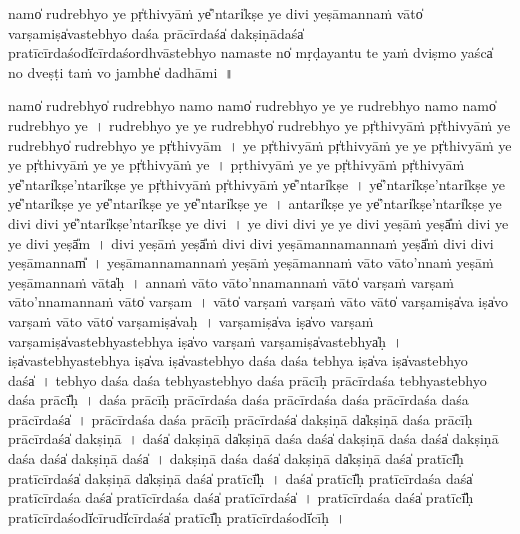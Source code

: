 \documentclass[parskip, DIV=14]{scrartcl}
\begin{document}
{namo̍ ru॒drebhyo॒ ye pṛ̍thi॒vyāṁ ye̎'ntari̍kṣe॒ ye di॒vi yeṣā॒manna॒ṁ vāto̍ va॒rṣamiṣa̍va॒stebhyo॒ daśa॒ prācī॒rdaśa̍ dakṣi॒ṇādaśa̍ pra॒tīcī॒rdaśodī̍cī॒rdaśo॒rdhvāstebhyo॒ nama॒ste no̍ mṛḍayantu॒ te yaṁ dvi॒ṣmo yaśca̍ no॒ dveṣṭi॒ taṁ vo॒ jambhe̍ dadhāmi~॥


namo̍ ru॒drebhyo̍ ru॒drebhyo॒ namo॒ namo̍ ru॒drebhyo॒ ye ye ru॒drebhyo॒ namo॒ namo̍ ru॒drebhyo॒ ye~।
ru॒drebhyo॒ ye ye ru॒drebhyo̍ ru॒drebhyo॒ ye pṛ̍thi॒vyāṁ pṛ̍thi॒vyāṁ ye ru॒drebhyo̍ ru॒drebhyo॒ ye pṛ̍thi॒vyām~।
ye pṛ̍thi॒vyāṁ pṛ̍thi॒vyāṁ ye ye pṛ̍thi॒vyāṁ ye ye pṛ̍thi॒vyāṁ ye ye pṛ̍thi॒vyāṁ ye~।
pṛ॒thi॒vyāṁ ye ye pṛ̍thi॒vyāṁ pṛ̍thi॒vyāṁ ye̎'ntari̍kṣe॒'ntari̍kṣe॒ ye pṛ̍thi॒vyāṁ pṛ̍thi॒vyāṁ ye̎'ntari̍kṣe~। %
ye̎'ntari̍kṣe॒'ntari̍kṣe॒ ye ye̎'ntari̍kṣe॒ ye ye̎'ntari̍kṣe॒ ye ye̎'ntari̍kṣe॒ ye~। %
a॒ntari̍kṣe॒ ye ye̎'ntari̍kṣe॒'ntari̍kṣe॒ ye di॒vi di॒vi ye̎'ntari̍kṣe॒'ntari̍kṣe॒ ye di॒vi~। %
ye di॒vi di॒vi ye ye di॒vi yeṣā॒ṁ yeṣā̎ṁ di॒vi ye ye di॒vi yeṣā̎m~। %
di॒vi yeṣā॒ṁ yeṣā̎ṁ di॒vi di॒vi yeṣā॒manna॒manna॒ṁ yeṣā̎ṁ di॒vi di॒vi yeṣā॒mannam̎~। %
yeṣā॒manna॒manna॒ṁ yeṣā॒ṁ yeṣā॒manna॒ṁ vāto॒ vāto'nna॒ṁ yeṣā॒ṁ yeṣā॒manna॒ṁ vāta̍ḥ~। %
anna॒ṁ vāto॒ vāto'nna॒manna॒ṁ vāto̍ va॒rṣaṁ va॒rṣaṁ vāto'nna॒manna॒ṁ vāto̍ va॒rṣam~। %
vāto̍ va॒rṣaṁ va॒rṣaṁ vāto॒ vāto̍ va॒rṣamiṣa̍va॒ iṣa̍vo va॒rṣaṁ vāto॒ vāto̍ va॒rṣamiṣa̍vaḥ~। %
va॒rṣamiṣa̍va॒ iṣa̍vo va॒rṣaṁ va॒rṣamiṣa̍va॒stebhya॒stebhya॒ iṣa̍vo va॒rṣaṁ va॒rṣamiṣa̍va॒stebhya̍ḥ~। %
iṣa̍va॒stebhya॒stebhya॒ iṣa̍va॒ iṣa̍va॒stebhyo॒ daśa॒ daśa॒ tebhya॒ iṣa̍va॒ iṣa̍va॒stebhyo॒ daśa̍~।
tebhyo॒ daśa॒ daśa॒ tebhya॒stebhyo॒ daśa॒ prācī॒ḥ prācī॒rdaśa॒ tebhya॒stebhyo॒ daśa॒ prācī̎ḥ~। %
daśa॒ prācī॒ḥ prācī॒rdaśa॒ daśa॒ prācī॒rdaśa॒ daśa॒ prācī॒rdaśa॒ daśa॒ prācī॒rdaśa̍~। %
prācī॒rdaśa॒ daśa॒ prācī॒ḥ prācī॒rdaśa̍ dakṣi॒ṇā da̍kṣi॒ṇā daśa॒ prācī॒ḥ prācī॒rdaśa̍ dakṣi॒ṇā~। %
daśa̍ dakṣi॒ṇā da̍kṣi॒ṇā daśa॒ daśa̍ dakṣi॒ṇā daśa॒ daśa̍ dakṣi॒ṇā daśa॒ daśa̍ dakṣi॒ṇā daśa̍~। %
da॒kṣi॒ṇā daśa॒ daśa̍ dakṣi॒ṇā da̍kṣi॒ṇā daśa̍ pra॒tīcī̎ḥ pra॒tīcī॒rdaśa̍ dakṣi॒ṇā da̍kṣi॒ṇā daśa̍ pra॒tīcī̎ḥ~।
daśa̍ pra॒tīcī̎ḥ pra॒tīcī॒rdaśa॒ daśa̍ pra॒tīcī॒rdaśa॒ daśa̍ pra॒tīcī॒rdaśa॒ daśa̍ pra॒tīcī॒rdaśa̍~।
pra॒tīcī॒rdaśa॒ daśa̍ pra॒tīcī̎ḥ pra॒tīcī॒rdaśodī̍cī॒rudī̍cī॒rdaśa̍ pra॒tīcī̎ḥ pra॒tīcī॒rdaśodī̍cīḥ~।
}
\end{document}
